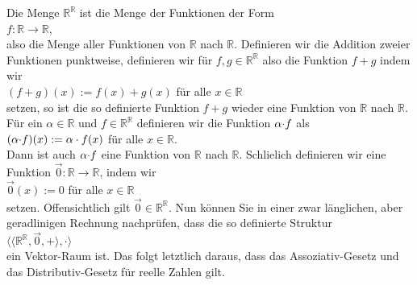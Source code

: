\example
Die Menge $\mathbb{R}^{\mathbb{R}}$ ist die Menge der Funktionen der Form
\\[0.2cm]
\hspace*{1.3cm}
 $f: \mathbb{R} \rightarrow \mathbb{R}$,
\\[0.2cm]
also die Menge aller Funktionen von $\mathbb{R}$ nach $\mathbb{R}$.
Definieren wir die Addition zweier Funktionen punktweise, definieren wir f\"{u}r $f,g \in \mathbb{R}^{\mathbb{R}}$ also die
Funktion $f+g$ indem wir
\\[0.2cm]
\hspace*{1.3cm}
$(f+g)(x) := f(x) + g(x)$  \quad f\"ur alle $x \in \mathbb{R}$
\\[0.2cm]
setzen, so ist die so definierte Funktion $f + g$ wieder eine Funktion von
$\mathbb{R}$ nach $\mathbb{R}$.  F\"{u}r ein $\alpha \in \mathbb{R}$ und $f
\in\mathbb{R}^{\mathbb{R}}$ definieren wir die Funktion
$\alpha {\color{blue}{\cdot}} f$ als
\\[0.2cm]
\hspace*{1.3cm}
$(\alpha {\color{blue}{\cdot}} f)(x) := \alpha \cdot f(x)$ \quad f\"ur alle $x \in \mathbb{R}$.
\\[0.2cm]
Dann ist auch  $\alpha {\color{blue}{\cdot}} f$ eine Funktion von $\mathbb{R}$ nach $\mathbb{R}$.  
Schlie\3lich definieren wir eine Funktion
 $\vec{0}:\mathbb{R} \rightarrow \mathbb{R}$, indem wir
\\[0.2cm]
\hspace*{1.3cm}
$\vec{0}(x) := 0$ \quad f\"ur alle $x \in \mathbb{R}$ 
\\[0.2cm]
setzen.  Offensichtlich  gilt $\vec{0} \in \mathbb{R}^{\mathbb{R}}$.  Nun k\"{o}nnen Sie
in einer zwar l\"{a}nglichen, aber geradlinigen Rechnung nachpr\"{u}fen, dass die so definierte Struktur
\\[0.2cm]
\hspace*{1.3cm}
$\bigl\langle \langle \mathbb{R}^{\mathbb{R}}, \vec{0}, + \rangle, \cdot \bigr\rangle$
\\[0.2cm]
ein Vektor-Raum ist.  Das folgt letztlich daraus, dass das Assoziativ-Gesetz und das Distributiv-Gesetz f\"{u}r reelle Zahlen
gilt.
 \eoxs

